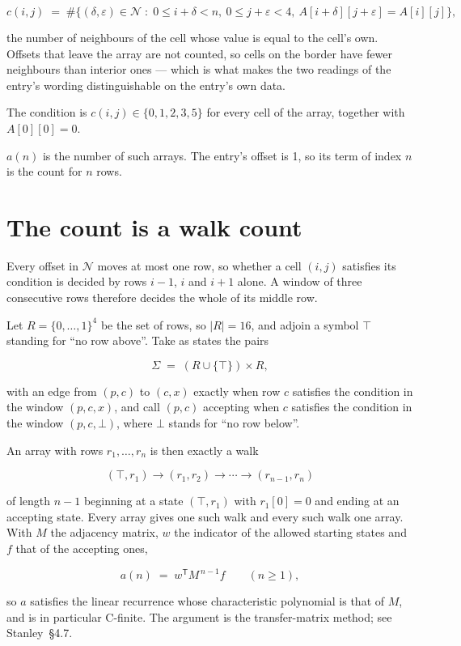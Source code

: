 \documentclass[11pt]{article}
\theoremstyle{definition}
\begin{document}
\[c(i,j) \;=\; \#\bigl\{(\delta,\varepsilon)\in\mathcal{N} \;:\; 0\le i+\delta<n,\ 0\le j+\varepsilon<4,\ A[i+\delta][j+\varepsilon] = A[i][j]\bigr\},\]

the number of neighbours of the cell whose value is equal to the cell's own. Offsets that leave the array are not counted, so cells on the border have fewer neighbours than interior ones --- which is what makes the two readings of the entry's wording distinguishable on the entry's own data.

The condition is $c(i,j) \in \{0, 1, 2, 3, 5\}$ for every cell of the array, together with $A[0][0]=0$.

$a(n)$ is the number of such arrays. The entry's offset is 1, so its term of index $n$ is the count for $n$ rows.

\section{The count is a walk count}

Every offset in $\mathcal{N}$ moves at most one row, so whether a cell $(i,j)$ satisfies its condition is decided by rows $i-1$, $i$ and $i+1$ alone. A window of three consecutive rows therefore decides the whole of its middle row.

Let $R = \{0,\dots,1\}^{4}$ be the set of rows, so $|R| = 16$, and adjoin a symbol $\top$ standing for ``no row above''. Take as states the pairs

\[\Sigma \;=\; (R \cup \{\top\}) \times R,\]

with an edge from $(p,c)$ to $(c,x)$ exactly when row $c$ satisfies the condition in the window $(p,c,x)$, and call $(p,c)$ accepting when $c$ satisfies the condition in the window $(p,c,\bot)$, where $\bot$ stands for ``no row below''.

An array with rows $r_1,\dots,r_n$ is then exactly a walk

\[(\top,r_1) \to (r_1,r_2) \to \cdots \to (r_{n-1},r_n)\]

of length $n-1$ beginning at a state $(\top,r_1)$ with $r_1[0]=0$ and ending at an accepting state. Every array gives one such walk and every such walk one array. With $M$ the adjacency matrix, $w$ the indicator of the allowed starting states and $f$ that of the accepting ones,

\[a(n) \;=\; w^{\mathsf T} M^{\,n-1} f \qquad (n \ge 1),\]

so $a$ satisfies the linear recurrence whose characteristic polynomial is that of $M$, and is in particular C-finite. The argument is the transfer-matrix method; see Stanley~\S4.7.
\end{document}
